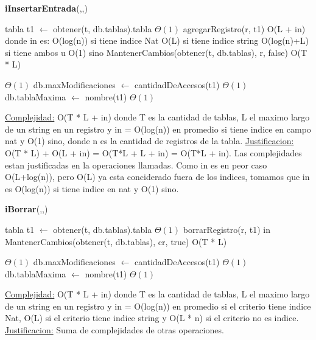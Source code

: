 \begin{algorithm}[H]{\textbf{iInsertarEntrada}(,,)}
    	\begin{algorithmic}[1]
    		\State tabla t1 $\gets$ obtener(t, db.tablas).tabla         \Comment $\Theta(1)$
    		\State agregarRegistro(r, t1)					\Comment O(L + in) donde in es: O(log(n)) si tiene indice Nat
    		\Statex											\Comment O(L) si tiene indice string
    		\Statex											\Comment O(log(n)+L) si tiene ambos u O(1) sino 
			\State MantenerCambios(obtener(t, db.tablas), r, false)    \Comment O(T * L)
			
			 	  \Comment $\Theta(1)$
	   			\State db.maxModificaciones $\gets$ cantidadDeAccesos(t1)  \Comment $\Theta(1)$
	   			\State db.tablaMaxima $\gets$ nombre(t1)  \Comment $\Theta(1)$
	   		\EndIf
						
			\medskip
			\Statex \underline{Complejidad:} O(T * L + in) donde T es la cantidad de tablas, L el maximo largo de un string en un registro y in = O(log(n)) en promedio si tiene indice en campo nat y O(1) sino, donde n es la cantidad de registros de la tabla. 
			\Statex \underline{Justificacion:} O(T * L) + O(L + in) = O(T*L + L + in) = O(T*L + in). Las complejidades estan justificadas en la operaciones llamadas. Como in es en peor caso O(L+log(n)), pero O(L) ya esta conciderado fuera de los indices, tomamos que in es O(log(n)) si tiene indice en nat y O(1) sino.
    	\end{algorithmic}
\end{algorithm}



\begin{algorithm}[H]{\textbf{iBorrar}(,,)}
    	\begin{algorithmic}[1]
    		\State tabla t1 $\gets$ obtener(t, db.tablas).tabla         \Comment $\Theta(1)$
    		\State borrarRegistro(r, t1)				\Comment in
			\State MantenerCambios(obtener(t, db.tablas), cr, true)   \Comment O(T * L)
			
			 	  \Comment $\Theta(1)$
	   			\State db.maxModificaciones $\gets$ cantidadDeAccesos(t1)  \Comment $\Theta(1)$
	   			\State db.tablaMaxima $\gets$ nombre(t1)  \Comment $\Theta(1)$
	   		\EndIf
			
			\medskip
			\Statex \underline{Complejidad:} O(T * L + in)  donde T es la cantidad de tablas, L el maximo largo de un string en un registro y in = O(log(n)) en promedio si el criterio tiene indice Nat, O(L) si el criterio tiene indice string y O(L * n) si el criterio no es indice.
			\Statex \underline{Justificacion:} Suma de complejidades de otras operaciones.
    	\end{algorithmic}
\end{algorithm}



